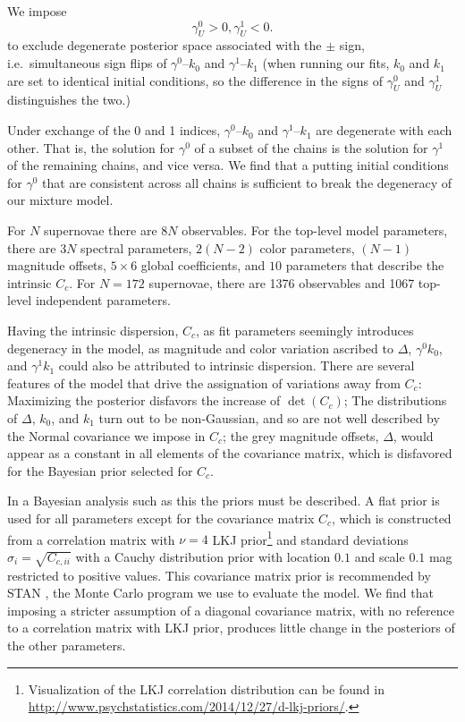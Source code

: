 \documentclass{aastex61}   	%
\begin{document}
We impose 
\begin{equation}
\gamma^0_U > 0, \gamma^1_U < 0.
\end{equation}
to exclude degenerate posterior space
associated
with the $\pm$ sign, i.e.\ simultaneous sign flips of
$\gamma^0$--$k_0$ and $\gamma^1$--$k_1$
(when running our fits, $k_0$ and $k_1$ are set to
identical initial conditions, so the difference in the signs of $\gamma^0_U$ and $\gamma^1_U$ distinguishes the two.)

Under exchange of the 0 and 1 indices, $\gamma^0$--$k_0$ and $\gamma^1$--$k_1$ are degenerate with
each other.  That is, the solution for $\gamma^0$ of a subset of the chains is the solution for $\gamma^1$ of the remaining chains, and vice versa.
We find that a putting initial conditions for $\gamma^0$ that are consistent across all chains is sufficient to break the degeneracy of our mixture model.
\color{black}

For $N$ supernovae there are $8N$ observables.  For the top-level model parameters, there are $3N$ spectral parameters, $2(N-2)$
color parameters, $(N-1)$ magnitude offsets,  $5 \times 6$ global coefficients, and $10$ parameters that describe the intrinsic
$C_c$.  For $N=172$ supernovae, there are 1376 observables and 1067 top-level independent parameters.


Having the intrinsic dispersion, $C_c$, as fit parameters seemingly introduces degeneracy in the model, as magnitude and color variation
ascribed to $\Delta$, $\gamma^0 k_0$, and $\gamma^1 k_1$ could also be attributed to intrinsic dispersion.  There are several features of the model
that drive the assignation of variations away from $C_c$:  Maximizing the posterior disfavors the increase of $\det{(C_c)}$;
The distributions of $\Delta$, $k_0$, and $k_1$ turn out to
be non-Gaussian, and so are not well described by the Normal covariance we impose in $C_c$; the grey magnitude offsets, $\Delta$, would appear as a constant
in all elements of the covariance matrix, which is disfavored for the Bayesian prior selected for $C_c$.

In a Bayesian analysis such as this the priors must be described.  A flat prior is used for all parameters except
for the covariance matrix $C_c$, which is constructed from a correlation matrix with  $\nu=4$  LKJ prior\footnote{
Visualization of the LKJ correlation distribution can be found in \url{http://www.psychstatistics.com/2014/12/27/d-lkj-priors/}.}
\citep{Lewandowski20091989} and standard
deviations $\sigma_i = \sqrt{C_{c,ii}}$ with a  Cauchy distribution prior with location
 $0.1$ and scale $0.1$ mag restricted to positive values.
This covariance matrix prior is recommended by STAN \citep{stan}, the Monte Carlo program we use to evaluate the model.
 We find that imposing a stricter assumption of a
 diagonal covariance matrix, with no reference to a correlation matrix with LKJ prior, produces little change in the posteriors of
 the other parameters.
\end{document}
